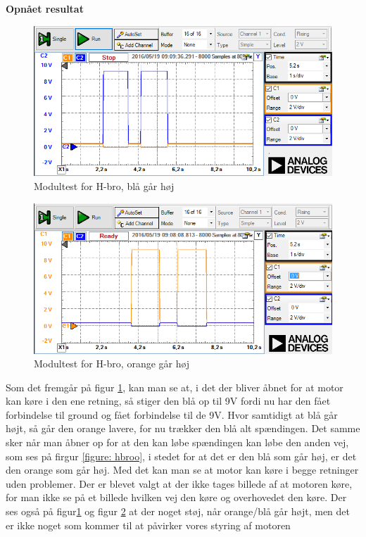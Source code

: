 \textbf{Opnået resultat}
\begin{figure}[H]
	\centering
	\includegraphics[width=\textwidth]{test/images/hbromob}
	\caption{Modultest for H-bro, blå går høj}
		\label{figure:hbrob}
	
\end{figure}
\begin{figure}[H]
	\centering
	\includegraphics[width=\textwidth]{test/images/hbromoo}
	\caption{Modultest for H-bro, orange går høj}
	\label{figure:hbroo}
	
\end{figure}
 Som det fremgår på figur \ref{figure:hbrob}, kan man se at, i det der bliver åbnet for at motor kan køre i den ene retning, så stiger den blå op til 9V fordi nu har den fået forbindelse til ground og fået forbindelse til de 9V. Hvor samtidigt at blå går højt, så går den orange lavere, for nu trækker den blå alt spændingen. Det samme sker når man åbner op for at den kan løbe spændingen kan løbe den anden vej, som ses på firgur \ref{figure: hbroo}, i stedet for at det er den blå som går høj, er det den orange som går høj. Med det kan man se at motor kan køre i begge retninger uden problemer.
 Der er blevet valgt at der ikke tages billede af at motoren køre, for man ikke se på et billede hvilken vej den køre og overhovedet den køre. Der ses også på figur\ref{figure:hbrob} og figur \ref{figure:hbroo} at der noget støj, når orange/blå går højt, men det er ikke noget som kommer til at påvirker vores styring af motoren

